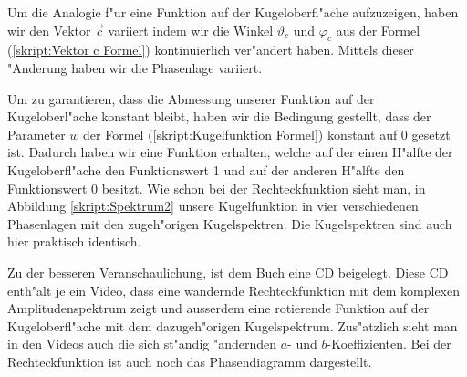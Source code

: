 \begin{refsection}
Um die Analogie f"ur eine Funktion auf der Kugeloberfl"ache aufzuzeigen, 
haben wir den Vektor $\vec{c}$ variiert indem wir die Winkel $\vartheta_c$
und $\varphi_c$ aus der Formel (\ref{skript:Vektor c Formel}) 
kontinuierlich ver"andert haben. 
Mittels dieser "Anderung haben wir die Phasenlage variiert.
 
Um zu garantieren, dass die Abmessung unserer Funktion auf der 
Kugeloberl"ache konstant bleibt, haben wir die Bedingung gestellt,
dass der Parameter $w$ der Formel (\ref{skript:Kugelfunktion Formel}) 
konstant auf 0 gesetzt ist. 
Dadurch haben wir eine Funktion erhalten, welche auf der einen 
H"alfte der Kugeloberfl"ache den Funktionswert 1 und auf der 
anderen H"alfte den Funktionswert 0 besitzt. 
Wie schon bei der Rechteckfunktion sieht man, in Abbildung 
\ref{skript:Spektrum2}  
unsere Kugelfunktion in vier verschiedenen Phasenlagen mit den 
zugeh"origen Kugelspektren.
Die Kugelspektren sind auch hier praktisch identisch. 

Zu der besseren Veranschaulichung, ist dem Buch eine CD 
beigelegt.
Diese CD enth"alt je ein Video, dass eine wandernde 
Rechteckfunktion mit dem komplexen Amplitudenspektrum zeigt und
ausserdem eine rotierende Funktion auf der Kugeloberfl"ache mit 
dem  dazugeh"origen Kugelspektrum. 
Zus"atzlich sieht man in den Videos auch
die sich st"andig "andernden $a$- und $b$-Koeffizienten. Bei der 
Rechteckfunktion ist auch noch das Phasendiagramm dargestellt.


\end{refsection}
